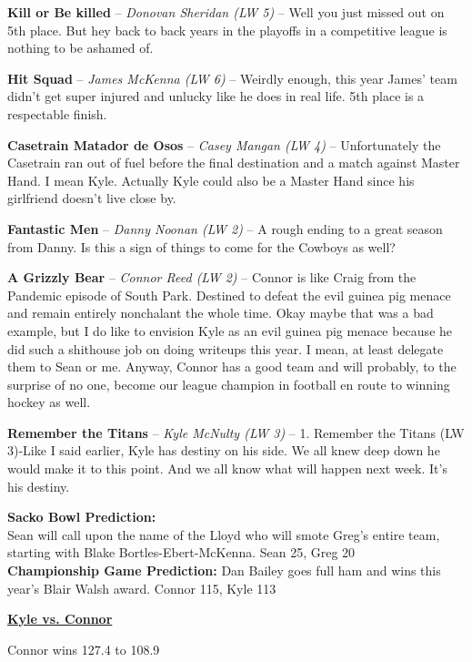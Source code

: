 \documentclass[11pt,letterpaper]{article}
\begin{document}
\begin{etaremune}
\item \textbf{Kill or Be killed} -- \textit{Donovan Sheridan (LW 5)} -- Well you just missed out on 5th place. But hey back to back years in the playoffs in a competitive league is nothing to be ashamed of. 
\item \textbf{Hit Squad} -- \textit{James McKenna (LW 6)} -- Weirdly enough, this year James' team didn't get super injured and unlucky like he does in real life. 5th place is a respectable finish. 
\item \textbf{Casetrain Matador de Osos} -- \textit{Casey Mangan (LW 4)} -- Unfortunately the Casetrain ran out of fuel before the final destination and a match against Master Hand. I mean Kyle. Actually Kyle could also be a Master Hand since his girlfriend doesn't live close by.
\item \textbf{Fantastic Men} -- \textit{Danny Noonan (LW 2)} -- A rough ending to a great season from Danny. Is this a sign of things to come for the Cowboys as well?
\item \textbf{A Grizzly Bear} -- \textit{Connor Reed (LW 2)} -- Connor is like Craig from the Pandemic episode of South Park. Destined to defeat the evil guinea pig menace and remain entirely nonchalant the whole time. Okay maybe that was a bad example, but I do like to envision Kyle as an evil guinea pig menace because he did such a shithouse job on doing writeups this year. I mean, at least delegate them to Sean or me. Anyway, Connor has a good team and will probably, to the surprise of no one, become our league champion in football en route to winning hockey as well.
\item \textbf{Remember the Titans} -- \textit{Kyle McNulty (LW 3)} -- 1. Remember the Titans (LW 3)-Like I said earlier, Kyle has destiny on his side. We all knew deep down he would make it to this point. And we all know what will happen next week. It's his destiny. 
\end{etaremune}
\bigskip\textbf{Sacko Bowl Prediction:}
\\Sean will call upon the name of the Lloyd who will smote Greg's entire team, starting with Blake Bortles-Ebert-McKenna. Sean 25, Greg 20
\bigskip\\\textbf{Championship Game Prediction:}
\noindent Dan Bailey goes full ham and wins this year's Blair Walsh award. Connor 115, Kyle 113


\newpage
{}



\textbf{\href{http://games.espn.com/ffl/boxscorefull?leagueId=1016777&teamId=4&scoringPeriodId=16&seasonId=2016&view=scoringperiod&version=full}
{Kyle vs. Connor}}
\par\noindent Connor wins 127.4 to 108.9
\bigskip
\par\noindent
\end{document}
